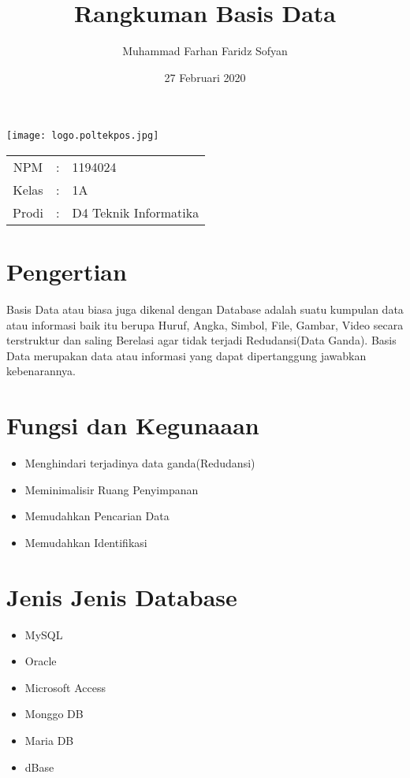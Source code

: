 \documentclass{article}
\title{Rangkuman Basis Data}
\author{Muhammad Farhan Faridz Sofyan}
\date{27 Februari 2020}
\begin{document}
\maketitle
\begin{center}
\texttt{[image: logo.poltekpos.jpg]}    
\end{center}

\begin{center}
\begin{tabular}{c c l}

    NPM & : & 1194024\\
    Kelas & : & 1A\\
    Prodi & : & D4 Teknik Informatika\\

\end{tabular}    
\end{center}

\newpage
\section{Pengertian}
Basis Data atau biasa juga dikenal dengan Database adalah suatu kumpulan data atau informasi baik itu berupa Huruf, Angka, Simbol, File, Gambar, Video secara terstruktur dan saling Berelasi agar tidak terjadi Redudansi(Data Ganda).
Basis Data merupakan data atau informasi yang dapat dipertanggung jawabkan kebenarannya.


\section{Fungsi dan Kegunaaan}
\begin{itemize}
    \item Menghindari terjadinya data ganda(Redudansi)
    \item Meminimalisir Ruang Penyimpanan
    \item Memudahkan Pencarian Data
    \item Memudahkan Identifikasi
\end{itemize}

\section{Jenis Jenis Database}
\begin{itemize}
    \item MySQL
    \item Oracle
    \item Microsoft Access
    \item Monggo DB
    \item Maria DB
    \item dBase
\end{itemize}
\end{document}
